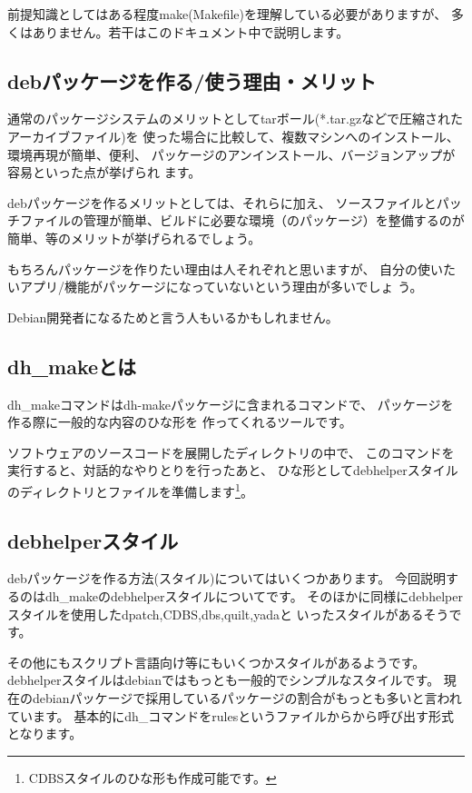 \documentclass[mingoth,a4paper]{jsarticle}
\begin{document}
前提知識としてはある程度make(Makefile)を理解している必要がありますが、
多くはありません。若干はこのドキュメント中で説明します。

\subsection{debパッケージを作る/使う理由・メリット}

通常のパッケージシステムのメリットとしてtarボール(*.tar.gzなどで圧縮されたアーカイブファイル)を
使った場合に比較して、複数マシンへのインストール、環境再現が簡単、便利、
パッケージのアンインストール、バージョンアップが容易といった点が挙げられ
ます。

debパッケージを作るメリットとしては、それらに加え、
ソースファイルとパッチファイルの管理が簡単、ビルドに必要な環境（のパッケージ）を整備するのが
簡単、等のメリットが挙げられるでしょう。

もちろんパッケージを作りたい理由は人それぞれと思いますが、
自分の使いたいアプリ/機能がパッケージになっていないという理由が多いでしょ
う。

Debian開発者になるためと言う人もいるかもしれません。


\subsection{dh\_makeとは}
dh\_makeコマンドはdh-makeパッケージに含まれるコマンドで、
パッケージを作る際に一般的な内容のひな形を
作ってくれるツールです。

ソフトウェアのソースコードを展開したディレクトリの中で、
このコマンドを実行すると、対話的なやりとりを行ったあと、
ひな形としてdebhelperスタイルのディレクトリとファイルを準備します\footnote{CDBSスタイルのひな形も作成可能です。}。

\subsection{debhelperスタイル}
debパッケージを作る方法(スタイル)についてはいくつかあります。
今回説明するのはdh\_makeのdebhelperスタイルについてです。
そのほかに同様にdebhelperスタイルを使用したdpatch,CDBS,dbs,quilt,yadaと
いったスタイルがあるそうです。

その他にもスクリプト言語向け等にもいくつかスタイルがあるようです。
debhelperスタイルはdebianではもっとも一般的でシンプルなスタイルです。
現在のdebianパッケージで採用しているパッケージの割合がもっとも多いと言われています。
基本的にdh\_コマンドをrulesというファイルからから呼び出す形式となります。
\end{document}
